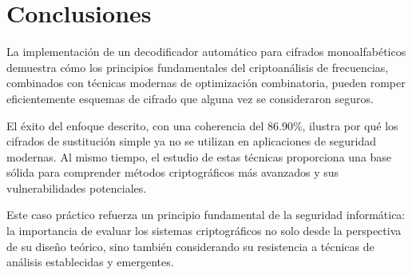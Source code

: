 \section{Conclusiones}

La implementación de un decodificador automático para cifrados monoalfabéticos demuestra cómo los principios fundamentales del criptoanálisis de frecuencias, combinados con técnicas modernas de optimización combinatoria, pueden romper eficientemente esquemas de cifrado que alguna vez se consideraron seguros.

El éxito del enfoque descrito, con una coherencia del 86.90\%, ilustra por qué los cifrados de sustitución simple ya no se utilizan en aplicaciones de seguridad modernas. Al mismo tiempo, el estudio de estas técnicas proporciona una base sólida para comprender métodos criptográficos más avanzados y sus vulnerabilidades potenciales.

Este caso práctico refuerza un principio fundamental de la seguridad informática: la importancia de evaluar los sistemas criptográficos no solo desde la perspectiva de su diseño teórico, sino también considerando su resistencia a técnicas de análisis establecidas y emergentes.